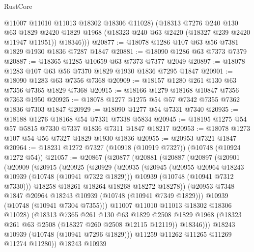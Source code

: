 \begin{lexlean}{RustCore}
\begin{coremodule}
          @11007
          @11010
          @11013
          @18302
          @18306
          @11028)
        (@18313
          @7276
          @240
          @130
          @63
          @1829
          @2420
          @1829
          @1968
          (@18323 @240 @63 @2420 (@18327 @239 @2420 @11947 @11951))
          @18346)))
@20877 := @18078 @1286 @107 @63 @56 @7381 @1829 @1930 @1836 @7287 @1847
@20881 := @18090 @1286 @63 @7373 @7379
@20887 := @18365 @1285 @10659 @63 @7373 @7377 @2049
@20897 := @18078 @1283 @107 @63 @56 @7370 @1829 @1930 @1836 @7295 @1847
@20901 := @18090 @1283 @63 @7356 @7368
@20909 := @18157 @1280 @261 @130 @63 @7356 @7365 @1829 @7368
@20915 := @18166 @1279 @18168 @10847 @7356 @7363 @1950
@20925 := @18078 @1277 @1275 @54 @57 @7342 @7355 @7362 @1836 @7303 @1847
@20929 := @18090 @1277 @54 @7331 @7340
@20935 := @18188 @1276 @18168 @54 @7331 @7338 @5834
@20945 := @18195 @1275 @54 @57 @5815 @7330 @7337 @1836 @7311 @1847 @18217
@20953 := @18078 @1273 @107 @54 @56 @7327 @1829 @1930 @1836
@20955 := @20953 @7321 @1847
@20964 := @18231 @1272 @7327 (@10918 (@10919 @7327)) (@10748 (@10924 @1272 @54))
@21057 := @20867
    (@20877
      (@20881
        (@20887
          (@20897
            (@20901
              (@20909
                (@20915
                  (@20925
                    (@20929
                      (@20935
                        (@20945
                          (@20955 @20964 @18243 @10939 (@10748 (@10941 @7322 @1829)))
                          @10939
                          (@10748 (@10941 @7312 @7330)))
                        @18258
                        @18261
                        @18264
                        @18268
                        @18272
                        @18278))
                    (@20953 @7348 @1847 @20964 @18243 @10939 (@10748 (@10941 @7349 @1829)))
                    @10939
                    (@10748 (@10941 @7304 @7355)))
                  @11007
                  @11010
                  @11013
                  @18302
                  @18306
                  @11028)
                (@18313
                  @7365
                  @261
                  @130
                  @63
                  @1829
                  @2508
                  @1829
                  @1968
                  (@18323 @261 @63 @2508 (@18327 @260 @2508 @12115 @12119))
                  @18346)))
            @18243
            @10939
            (@10748 (@10941 @7296 @1829)))
          @11259
          @11262
          @11265
          @11269
          @11274
          @11280))
      @18243
      @10939

\end{coremodule}
\end{lexlean}
